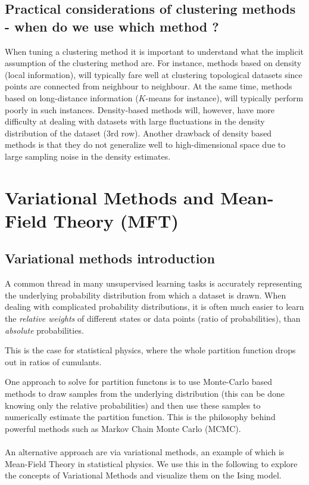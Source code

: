 \subsection{Practical considerations of clustering methods - when do we use which method ?}
When tuning a clustering method it is important to understand what the implicit assumption of the clustering method are. For instance, methods based on density (local information), will typically fare well at clustering topological datasets since points are connected from neighbour to neighbour. At the same time, methods based on long-distance information ($𝐾$-means for instance), will typically perform poorly in such instances. Density-based methods will, however, have more difficulty at dealing with datasets with large fluctuations in the density distribution of the dataset (3rd row). Another drawback of density based methods is that they do not generalize well to high-dimensional space due to large sampling noise in the density estimates.








\section{Variational Methods and Mean-Field Theory (MFT)}
\label{sec:varMFT}
\subsection{Variational methods introduction}
\label{subsec:varMFTconcept}
A common thread in many unsupervised learning tasks is accurately representing the underlying probability distribution from which a dataset is drawn. When dealing with complicated probability distributions, it is often much easier to learn the \emph{relative weights} of different states or data points (ratio of probabilities), than \emph{absolute} probabilities. 
\begin{example}
	This is the case for statistical physics, where the whole partition function drops out in ratios of cumulants. 
\end{example}
One approach to solve for partition functons is to use Monte-Carlo based methods to draw samples from the underlying distribution (this can be done knowing only the relative probabilities) and then use these samples to numerically estimate the partition function. This is the philosophy behind powerful methods such as Markov Chain Monte Carlo (MCMC).\\
\\
An alternative approach are via variational methods, an example of which is Mean-Field Theory in statistical physics. We use this in the following to explore the concepts of Variational Methods and visualize them on the Ising model.



